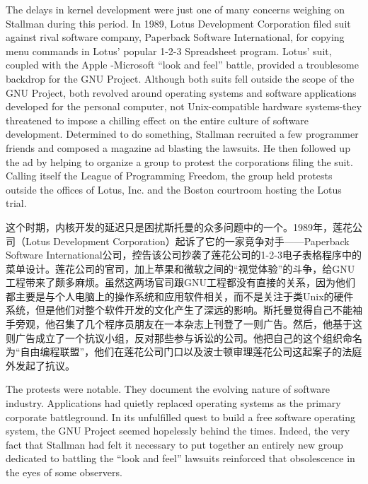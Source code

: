 \ifdefined\eng
The delays in kernel development were just one of many concerns weighing on Stallman during this period. In 1989, Lotus Development Corporation filed suit against rival software company, Paperback Software International, for copying menu commands in Lotus' popular 1-2-3 Spreadsheet program. Lotus' suit, coupled with the Apple -Microsoft ``look and feel'' battle, provided a troublesome backdrop for the GNU Project. Although both suits fell outside the scope of the GNU Project, both revolved around operating systems and software applications developed for the personal computer, not Unix-compatible hardware systems-they threatened to impose a chilling effect on the entire culture of software development. Determined to do something, Stallman recruited a few programmer friends and composed a magazine ad blasting the lawsuits. He then followed up the ad by helping to organize a group to protest the corporations filing the suit. Calling itself the League of Programming Freedom, the group held protests outside the offices of Lotus, Inc. and the Boston courtroom hosting the Lotus trial.
\fi

\ifdefined\chs
这个时期，内核开发的延迟只是困扰斯托曼的众多问题中的一个。1989年，莲花公司（Lotus Development Corporation）起诉了它的一家竞争对手——Paperback Software International公司，控告该公司抄袭了莲花公司的1-2-3电子表格程序中的菜单设计。莲花公司的官司，加上苹果和微软之间的``视觉体验''的斗争，给GNU工程带来了颇多麻烦。虽然这两场官司跟GNU工程都没有直接的关系，因为他们都主要是与个人电脑上的操作系统和应用软件相关，而不是关注于类Unix的硬件系统，但是他们对整个软件开发的文化产生了深远的影响。斯托曼觉得自己不能袖手旁观，他召集了几个程序员朋友在一本杂志上刊登了一则广告。然后，他基于这则广告成立了一个抗议小组，反对那些参与诉讼的公司。他把自己的这个组织命名为``自由编程联盟''，他们在莲花公司门口以及波士顿审理莲花公司这起案子的法庭外发起了抗议。
\fi

\ifdefined\eng
The protests were notable. They document the evolving nature of software industry. Applications had quietly replaced operating systems as the primary corporate battleground. In its unfulfilled quest to build a free software operating system, the GNU Project seemed hopelessly behind the times. Indeed, the very fact that Stallman had felt it necessary to put together an entirely new group dedicated to battling the ``look and feel'' lawsuits reinforced that obsolescence in the eyes of some observers.
\fi

